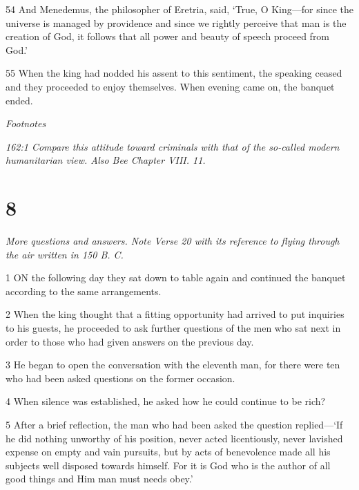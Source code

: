 \par 54 And Menedemus, the philosopher of Eretria, said, ‘True, O King—for since the universe is managed by providence and since we rightly perceive that man is the creation of God, it follows that all power and beauty of speech proceed from God.’

\par 55 When the king had nodded his assent to this sentiment, the speaking ceased and they proceeded to enjoy themselves. When evening came on, the banquet ended.

\par \textit{Footnotes}

\par \textit{162:1 Compare this attitude toward criminals with that of the so-called modern humanitarian view. Also Bee Chapter VIII. 11.}

\chapter{8}

\par \textit{More questions and answers. Note Verse 20 with its reference to flying through the air written in 150 B. C.}

\par 1 ON the following day they sat down to table again and continued the banquet according to the same arrangements.

\par 2 When the king thought that a fitting opportunity had arrived to put inquiries to his guests, he proceeded to ask further questions of the men who sat next in order to those who had given answers on the previous day.

\par 3 He began to open the conversation with the eleventh man, for there were ten who had been asked questions on the former occasion.

\par 4 When silence was established, he asked how he could continue to be rich?

\par 5 After a brief reflection, the man who had been asked the question replied—‘If he did nothing unworthy of his position, never acted licentiously, never lavished expense on empty and vain pursuits, but by acts of benevolence made all his subjects well disposed towards himself. For it is God who is the author of all good things and Him man must needs obey.’

